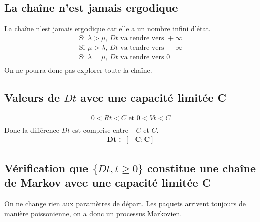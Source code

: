 \documentclass[12pt, a4paper]{article}
\begin{document}
\subsection{La cha\^ine n'est jamais ergodique}
La cha\^ine n'est jamais ergodique car elle a un nombre infini d'\'etat.
\begin{gather*}
\text{Si } \lambda > \mu \text{, } Dt \text{ va tendre vers } +\infty \\
\text{Si } \mu > \lambda \text{, } Dt \text{ va tendre vers } -\infty \\
\text{Si } \lambda = \mu \text{, } Dt \text{ va tendre vers } 0 \\
\end{gather*}
On ne pourra donc pas explorer toute la cha\^ine.

\subsection{Valeurs de $Dt$ avec une capacit\'e limit\'ee C}

\begin{gather*}
0<Rt<C \text{ et } 0<Vt<C \\
\end{gather*}
Donc la diff\'erence $Dt$ est comprise entre $-C$ et $C$.
\bigskip
\begin{gather*}
\bm{Dt \in [-C; C]}
\end{gather*}

\newpage
\subsection{V\'erification que $\{Dt, t \ge 0\}$ constitue une cha\^ine de Markov avec une capacit\'e limit\'ee C}
On ne change rien aux param\`etres de d\'epart. Les paquets arrivent toujours de mani\`ere poissonienne, on a donc un processus Markovien.
\end{document}
